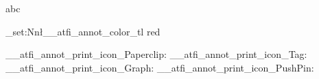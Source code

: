 \documentclass{article}
\begin{document}
abc
\ExplSyntaxOn
%

\tl_set:Nn\l__atfi_annot_color_tl {red}

\__atfi_annot_print_icon_Paperclip:
\__atfi_annot_print_icon_Tag:
\__atfi_annot_print_icon_Graph:
\__atfi_annot_print_icon_PushPin:


\ExplSyntaxOff
\end{document}
